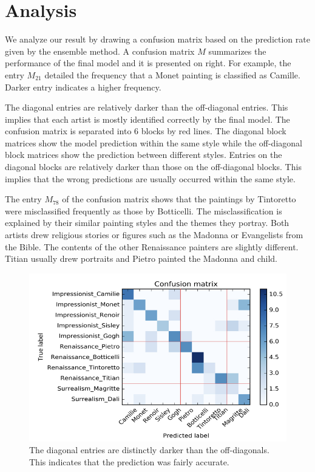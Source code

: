 \documentclass[11pt,a4paper]{article}
\begin{document}
\section{Analysis}
We analyze our result by drawing a confusion matrix based on the prediction rate given by the ensemble method. A confusion matrix $M$ summarizes the performance of the final model and it is presented on right. For example, the entry $M_{21}$ detailed the frequency that a Monet painting is classified as Camille. Darker entry indicates a higher frequency.

The diagonal entries are relatively darker than the off-diagonal entries. This implies that each artist is mostly identified correctly by the final model. The confusion matrix is separated into 6 blocks by red lines. The diagonal block matrices show the model prediction within the same style while the off-diagonal block matrices show the prediction between different styles. Entries on the diagonal blocks are relatively darker than those on the off-diagonal blocks. This implies that the wrong predictions are usually occurred within the same style. 

The entry $M_{78}$ of the confusion matrix shows that the paintings by Tintoretto were misclassified frequently as those by Botticelli. The misclassification is explained by their similar painting styles and the themes they portray. Both artists drew religious stories or figures such as the Madonna or Evangelists from the Bible. The contents of the other Renaissance painters are slightly different. Titian usually drew portraits and Pietro painted the Madonna and child.

\begin{figure}
    \centering
    \includegraphics[width = 5in]{conf_mat}
    \caption{The diagonal entries are distinctly darker than the off-diagonals. This indicates that the prediction was fairly accurate.}
    \label{conf_mat}
\end{figure}
\end{document}
